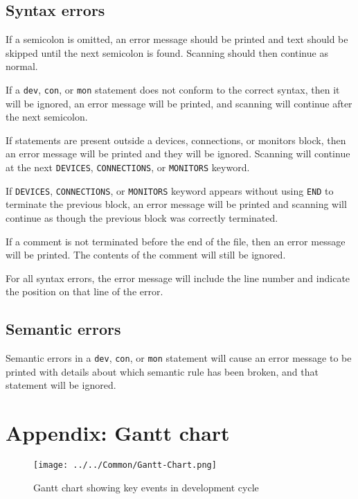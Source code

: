 \documentclass[a4paper,10pt]{article}
\begin{document}
\subsection{Syntax errors}

If a semicolon is omitted, an error message should be printed and text should be skipped until the next semicolon is found. Scanning should then continue as normal.

If a \texttt{dev}, \texttt{con}, or \texttt{mon} statement does not conform to the correct syntax, then it will be ignored, an error message will be printed, and scanning will continue after the next semicolon. 

If statements are present outside a devices, connections, or monitors block, then an error message will be printed and they will be ignored. Scanning will continue at the next \texttt{DEVICES}, \texttt{CONNECTIONS}, or \texttt{MONITORS} keyword. 

If \texttt{DEVICES}, \texttt{CONNECTIONS}, or \texttt{MONITORS} keyword appears without using \texttt{END} to terminate the previous block, an error message will be printed and scanning will continue as though the previous block was correctly terminated. 

If a comment is not terminated before the end of the file, then an error message will be printed. The contents of the comment will still be ignored. 

For all syntax errors, the error message will include the line number and indicate the position on that line of the error.


\subsection{Semantic errors}

Semantic errors in a \texttt{dev}, \texttt{con}, or \texttt{mon} statement will cause an error message to be printed with details about which semantic rule has been broken, and that statement will be ignored. 

\clearpage
\appendix

\section{Appendix: Gantt chart}
\begin{figure}[h]
 \centering
  \texttt{[image: ../../Common/Gantt-Chart.png]}
 \caption{Gantt chart showing key events in development cycle}
 \label{fig:ganttchart}
\end{figure}
\end{document}
